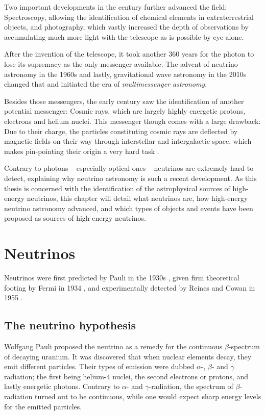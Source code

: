\documentclass[
    a4paper, %
    fontsize=10pt, %
    twoside=false, %
    numbers=noenddot, %
    fontmethod=tex,
]{kaobook}
\begin{document}
Two important developments in the  century further advanced the field: Spectroscopy, allowing the identification of chemical elements in extraterrestrial objects, and photography, which vastly increased the depth of observations by accumulating much more light with the telescope as is possible by eye alone.

After the invention of the telescope, it took another 360 years for the photon to lose its supremacy as the only messenger available. The advent of neutrino astronomy in the 1960s and lastly, gravitational wave astronomy in the 2010s changed that and initiated the era of \textit{multimessenger astronomy}.

Besides those messengers, the early  century saw the identification of another potential messenger: Cosmic rays, which are largely highly energetic protons, electrons and helium nuclei. This messenger though comes with a large drawback: Due to their charge, the particles constituting cosmic rays are deflected by magnetic fields on their way through interstellar and intergalactic space, which makes pin-pointing their origin a very hard task \cite{Beckman2021}. 

Contrary to photons -- especially optical ones -- neutrinos are extremely hard to detect, explaining why neutrino astronomy is such a recent development. As this thesis is concerned with the identification of the astrophysical sources of high-energy neutrinos, this chapter will detail what neutrinos are, how high-energy neutrino astronomy advanced, and which types of objects and events have been proposed as sources of high-energy neutrinos. 

\section{Neutrinos}
Neutrinos were first predicted by Pauli in the 1930s , given firm theoretical footing by Fermi in 1934 , and experimentally detected by Reines and Cowan in 1955 .

\subsection{The neutrino hypothesis} \label{neutrino_hypothesis}
Wolfgang Pauli proposed the neutrino as a remedy for the continuous $\beta$-spectrum of decaying uranium. It was discovered that when nuclear elements decay, they emit different particles. Their types of emission were dubbed $\alpha$-, $\beta$- and $\gamma$ radiation; the first being helium-4 nuclei, the second electrons or protons, and lastly energetic photons. Contrary to $\alpha$- and $\gamma$-radiation, the spectrum of $\beta$-radiation turned out to be continuous, while one would expect sharp energy levels for the emitted particles.
\end{document}
